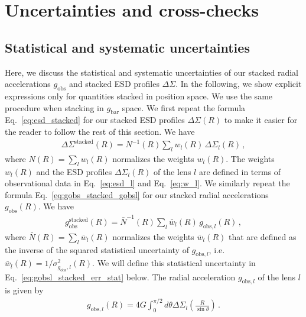 \documentclass[a4paper,11pt]{article}
\newcommand{\gobs}{\ensuremath{g_{\mathrm{obs}}}}
\begin{document}
\section{Uncertainties and cross-checks}

\subsection{Statistical and systematic uncertainties}
\label{sec:appendix:errors}

Here, we discuss the statistical and systematic uncertainties of our stacked radial accelerations $\gobs$ and stacked ESD profiles $\Delta \Sigma$.
In the following, we show explicit expressions only for quantities stacked in position space.
We use the same procedure when stacking in $g_{\mathrm{bar}}$ space.
We first repeat the formula Eq.~\eqref{eq:esd_stacked} for our stacked ESD profiles $\Delta \Sigma(R)$ to make it easier for the reader to follow the rest of this section.
We have
\begin{align}
 \Delta \Sigma^{\mathrm{stacked}}(R) = N^{-1}(R) \sum_l w_l(R) \, \Delta \Sigma_l(R) \,,
\end{align}
where $N(R) = \sum_l w_l(R)$ normalizes the weights $w_l(R)$.
The weights $w_l(R)$ and the ESD profiles $\Delta \Sigma_l(R)$ of the lens $l$ are defined in terms of observational data in Eq.~\eqref{eq:esd_l} and Eq.~\eqref{eq:w_l}.
We similarly repeat the formula Eq.~\eqref{eq:gobs_stacked_gobsl} for our stacked radial accelerations $\gobs(R)$.
We have
\begin{align}
 g_{\mathrm{obs}}^{\mathrm{stacked}}(R) = \bar{N}^{-1}(R) \sum_l \bar{w}_l(R) \, g_{\mathrm{obs},l}(R)\,,
\end{align}
where $\bar{N}(R) = \sum_l \bar{w}_l(R)$ normalizes the weights $\bar{w}_l(R)$ that are defined as the inverse of the squared statistical uncertainty of $g_{\mathrm{obs},l}$, i.e. $\bar{w}_l(R) = 1/\sigma^2_{g_{\mathrm{obs}},l}(R)$.
We will define this statistical uncertainty in Eq.~\eqref{eq:gobsl_stacked_err_stat} below.
The radial acceleration $g_{\mathrm{obs},l}$ of the lens $l$ is given by
\begin{align}
 \label{eq:gobsldefinition}
 g_{\mathrm{obs},l}(R) = 4G \int_0^{\pi/2} d\theta \Delta \Sigma_l\left(\frac{R}{\sin \theta}\right) \,.
\end{align}
\end{document}
